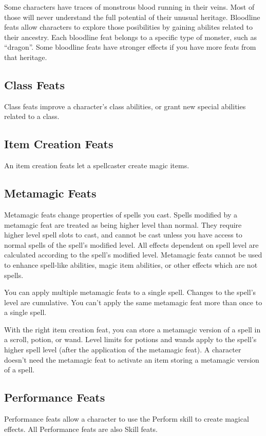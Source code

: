 Some characters have traces of monstrous blood running in their veins.
Most of those will never understand the full potential of their unusual heritage.
Bloodline feats allow characters to explore those posibilities by gaining abilites related to their ancestry.
Each bloodline feat belongs to a specific type of monster, such as ``dragon''.
Some bloodline feats have stronger effects if you have more feats from that heritage.

\subsection{Class Feats}
Class feats improve a character's class abilities, or grant new special abilities related to a class.

\subsection{Item Creation Feats}
An item creation feats let a spellcaster create magic items.

\subsection{Metamagic Feats}
Metamagic feats change properties of spells you cast.
Spells modified by a metamagic feat are treated as being higher level than normal.
They require higher level spell slots to cast, and cannot be cast unless you have access to normal spells of the spell's modified level.
All effects dependent on spell level are calculated according to the spell's modified level.
Metamagic feats cannot be used to enhance spell-like abilities, magic item abilities, or other effects which are not spells.

You can apply multiple metamagic feats to a single spell.
Changes to the spell's level are cumulative.
You can't apply the same metamagic feat more than once to a single spell.

With the right item creation feat, you can store a metamagic version of a spell in a scroll, potion, or wand.
Level limits for potions and wands apply to the spell's higher spell level (after the application of the metamagic feat).
A character doesn't need the metamagic feat to activate an item storing a metamagic version of a spell.

\subsection{Performance Feats}
Performance feats allow a character to use the Perform skill to create magical effects.
All Performance feats are also Skill feats.

